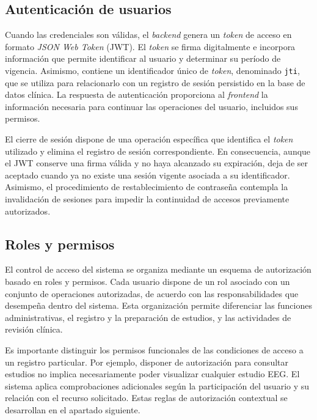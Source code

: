 \subsection{Autenticación de usuarios}
\label{subsec:autenticacion-usuarios}

Cuando las credenciales son válidas, el \textit{backend} genera un \textit{token} de acceso en formato \textit{JSON Web Token} (JWT).
 El \textit{token} se firma digitalmente e incorpora información que permite identificar al usuario y determinar su período de vigencia. Asimismo, contiene un identificador único de \textit{token}, denominado \texttt{jti}, que se utiliza para relacionarlo con un registro de sesión persistido en la base de datos clínica. La respuesta de autenticación proporciona al \textit{frontend} la información necesaria para continuar las operaciones del usuario, incluidos sus permisos.

El cierre de sesión dispone de una operación específica que identifica el \textit{token} utilizado y elimina el registro de sesión correspondiente. En consecuencia, aunque el JWT conserve una firma válida y no haya alcanzado su expiración, deja de ser aceptado cuando ya no existe una sesión vigente asociada a su identificador. Asimismo, el procedimiento de restablecimiento de contraseña contempla la invalidación de sesiones para impedir la continuidad de accesos previamente autorizados.

\subsection{Roles y permisos}
\label{subsec:roles-permisos}

El control de acceso del sistema se organiza mediante un esquema de autorización basado en roles y permisos. Cada usuario dispone de un rol asociado con un conjunto de operaciones autorizadas, de acuerdo con las responsabilidades que desempeña dentro del sistema. Esta organización permite diferenciar las funciones administrativas, el registro y la preparación de estudios, y las actividades de revisión clínica.

Es importante distinguir los permisos funcionales de las condiciones de acceso a un registro particular. Por ejemplo, disponer de autorización para consultar estudios no implica necesariamente poder visualizar cualquier estudio EEG. El sistema aplica comprobaciones adicionales según la participación del usuario y su relación con el recurso solicitado. Estas reglas de autorización contextual se desarrollan en el apartado siguiente.

